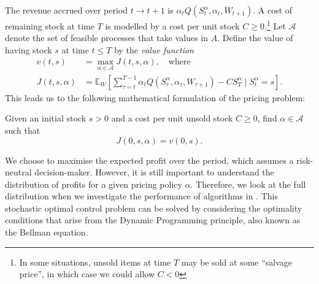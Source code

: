 \documentclass[main.tex]{subfiles}
\begin{document}
The revenue accrued over period $t\to t+1$ is $\alpha_tQ(S_t^\alpha,\alpha_t,W_{t+1})$.
A cost of remaining stock at time $T$ is modelled by a cost per unit
stock $C\geq 0$.\footnote{In some situations, unsold items at time $T$
  may be sold at some ``salvage price'', in which case we could allow
  $C<0$}
Let $\mathcal A$ denote the set of feasible processes that take values
in $A$.
Define the value of having stock $s$ at time $t\leq T$
by the \emph{value function}
\begin{align}\label{eq:value_function_def}
  v(t,s)&=\max_{\alpha\in\mathcal A} J(t,s,\alpha),\quad\text{where}\\
  J(t,s,\alpha)&=
                 \mathbb E_{W}\left[ \sum_{\tau=t}^{T-1}
                 \alpha_tQ(S_\tau^\alpha,\alpha_\tau,W_{\tau+1})
                 - CS_T^\alpha \mid S_t^\alpha = s
                 \right].
                 \label{eq:value_function_def2}
\end{align}
This leads us to the following mathematical formulation of the pricing
problem:
\begin{mydef}
  Given an initial stock $s>0$ and a cost per unit unsold stock $C\geq
  0$, find $\alpha\in\mathcal A$ such that
  \begin{equation}
    J(0,s,\alpha) = v(0,s).
  \end{equation}
\end{mydef}
We choose to maximise the expected profit over the period, which
assumes a risk-neutral decision-maker. However, it is still important
to understand the distribution of profits for a given pricing policy
$\alpha$. Therefore, we look at the full distribution when
we investigate the performance of algorithms in
.
This stochastic optimal control problem can be solved by
considering the optimality conditions that arise from the Dynamic
Programming principle, also known as the Bellman equation.
\end{document}
